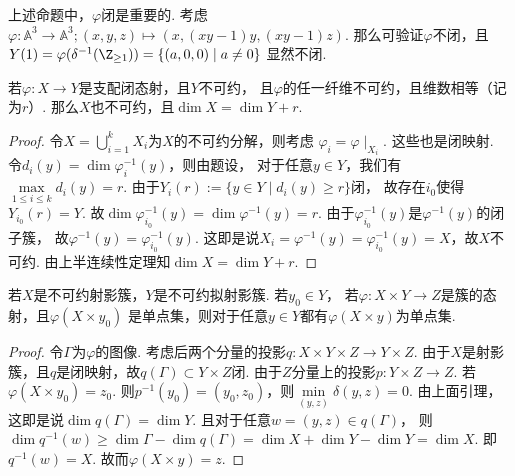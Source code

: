     \begin{remark}
        上述命题中，$\varphi$闭是重要的. 
        考虑$\varphi\colon\mathbb{A}^{3} \rightarrow \mathbb{A}^{3};(x,y,z) \mapsto (x,(xy-1)y,(xy-1)z)$.
        那么可验证$\varphi$不闭，且$Y(1)=\varphi(\delta^{-1}(\Z_{\geq 1}))=\{(a,0,0) \mid a \neq 0\}$
        显然不闭.
    \end{remark}

    \begin{proposition}
        若$\varphi\colon X \rightarrow Y$是支配闭态射，且$Y$不可约，
        且$\varphi$的任一纤维不可约，且维数相等（记为$r$）.
        那么$X$也不可约，且$\dim X = \dim Y + r$.
    \end{proposition}
    \begin{proof}
        令$X=\bigcup_{i=1}^{k}X_{i}$为$X$的不可约分解，则考虑
        $\varphi_{i} = \varphi\mid_{X_{i}}$. 
        这些也是闭映射. 
        令$d_{i}(y)=\dim \varphi_{i}^{-1}(y)$，则由题设，
        对于任意$y \in Y$，我们有
        $\max\limits_{1 \leq i \leq k}d_{i}(y) = r$.
        由于$Y_{i}(r):=\{y \in Y \mid d_{i}(y) \geq r\}$闭，
        故存在$i_{0}$使得$Y_{i_0}(r)=Y$.
        故$\dim \varphi_{i_{0}}^{-1}(y) = \dim \varphi^{-1}(y) = r$.
        由于$\varphi_{i_{0}}^{-1}(y)$是$\varphi^{-1}(y)$的闭子簇，
        故$\varphi^{-1}(y) = \varphi_{i_{0}}^{-1}(y)$.
        这即是说$X_{i}=\varphi^{-1}(y) = \varphi_{i_{0}}^{-1}(y)=X$，故$X$不可约.
        由上半连续性定理知$\dim X = \dim Y + r$.
    \end{proof}

    \begin{theorem}
        若$X$是不可约射影簇，$Y$是不可约拟射影簇. 若$y_{0} \in Y$，
        若$\varphi\colon X \times Y \rightarrow Z$是簇的态射，且$\varphi(X \times y_{0})$
        是单点集，则对于任意$y \in Y$都有$\varphi(X \times y)$为单点集.
    \end{theorem}
    \begin{proof}
        令$\Gamma$为$\varphi$的图像. 
        考虑后两个分量的投影$q\colon X \times Y \times Z \rightarrow Y \times Z$.
        由于$X$是射影簇，且$q$是闭映射，故$q(\Gamma) \subset Y \times Z$闭.
        由于$Z$分量上的投影$p\colon Y \times Z \rightarrow Z$. 若$\varphi(X \times y_{0})=z_{0}$.
        则$p^{-1}(y_{0})=(y_{0},z_{0})$，则$\min\limits_{(y,z)} \delta(y,z)=0$.
        由上面引理，这即是说$\dim q(\Gamma) = \dim Y$. 且对于任意$w=(y,z) \in q(\Gamma)$，
        则$\dim q^{-1}(w) \geq \dim \Gamma - \dim q(\Gamma) = \dim X + \dim Y - \dim Y = \dim X$.
        即$q^{-1}(w)=X$. 故而$\varphi(X \times y)=z$.
    \end{proof}

